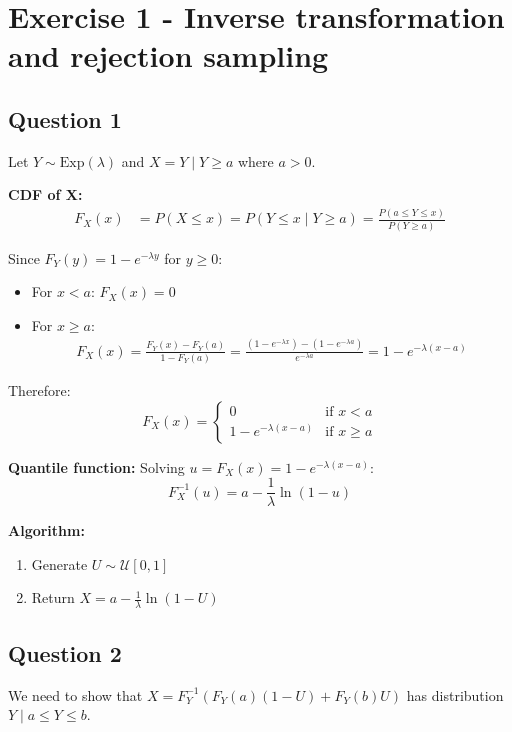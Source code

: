\section*{Exercise 1 - Inverse transformation and rejection sampling}

\subsection*{Question 1}
Let $Y \sim \text{Exp}(\lambda)$ and $X = Y \mid Y \geq a$ where $a > 0$.

\textbf{CDF of X:}
\begin{align*}
F_X(x) &= P(X \leq x) = P(Y \leq x \mid Y \geq a) = \frac{P(a \leq Y \leq x)}{P(Y \geq a)}
\end{align*}

Since $F_Y(y) = 1 - e^{-\lambda y}$ for $y \geq 0$:
\begin{itemize}
\item For $x < a$: $F_X(x) = 0$
\item For $x \geq a$: 
\begin{align*}
F_X(x) = \frac{F_Y(x) - F_Y(a)}{1 - F_Y(a)} = \frac{(1-e^{-\lambda x}) - (1-e^{-\lambda a})}{e^{-\lambda a}} = 1 - e^{-\lambda(x-a)}
\end{align*}
\end{itemize}

Therefore:
\begin{equation*}
F_X(x) = \begin{cases} 
0 & \text{if } x < a \\ 
1 - e^{-\lambda(x-a)} & \text{if } x \geq a 
\end{cases}
\end{equation*}

\textbf{Quantile function:} Solving $u = F_X(x) = 1 - e^{-\lambda(x-a)}$:
\begin{equation*}
F_X^{-1}(u) = a - \frac{1}{\lambda}\ln(1-u)
\end{equation*}

\textbf{Algorithm:}
\begin{enumerate}
\item Generate $U \sim \mathcal{U}[0,1]$
\item Return $X = a - \frac{1}{\lambda}\ln(1-U)$
\end{enumerate}

\subsection*{Question 2}
We need to show that $X = F_Y^{-1}(F_Y(a)(1-U) + F_Y(b)U)$ has distribution $Y \mid a \leq Y \leq b$.

